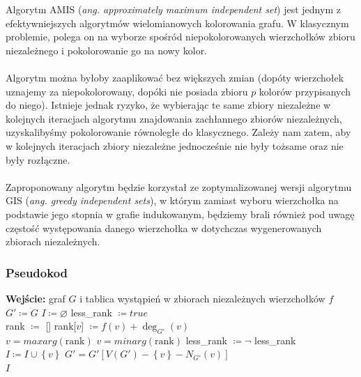 \documentclass[10pt,a4paper]{article}
\begin{document}
	Algorytm AMIS (\textit{ang. approximately maximum independent set}) jest jednym z efektywniejszych algorytmów wielomianowych kolorowania grafu. W klasycznym problemie, polega on na wyborze spośród niepokolorowanych wierzchołków zbioru niezależnego i pokolorowanie go na nowy kolor. \\~\\
	Algorytm można byłoby zaaplikować bez większych zmian (dopóty wierzchołek uznajemy za niepokolorowany, dopóki nie posiada zbioru $p$ kolorów przypisanych do niego). Istnieje jednak ryzyko, że wybierając te same zbiory niezależne w kolejnych iteracjach algorytmu znajdowania zachłannego zbiorów niezależnych, uzyskalibyśmy pokolorowanie równoległe do klasycznego. Zależy nam zatem, aby w kolejnych iteracjach zbiory niezależne jednocześnie  nie były tożsame oraz nie były rozłączne. \\~\\
	Zaproponowany algorytm będzie korzystał ze zoptymalizowanej wersji algorytmu GIS (\textit{ang. greedy independent sets}), w którym zamiast wyboru wierzchołka na podstawie jego stopnia w grafie indukowanym, będziemy brali również pod uwagę częstość występowania danego wierzchołka w dotychczas wygenerowanych zbiorach niezależnych. 
	
	\subsubsection{Pseudokod}
	
	\begin{algorithmic}
		\State \textbf{Wejście:} graf $G$ i tablica wystąpień w zbiorach niezależnych wierzchołków $f$
		\\
			\State $G' \coloneqq G$
			\State $I \coloneqq \varnothing$
			\State less\_rank $\coloneqq true$
			\\
				\State rank $\coloneqq$ [] 
				\State rank[$v$] $\coloneqq f(v) + \deg_{G'}(v)$ 
				\EndFor
				\\
					\State $v = maxarg(\text{rank})$
				\Else
					\State $v = minarg(\text{rank})$
				\EndIf
				\State less\_rank $\coloneqq \neg$ less\_rank
				\\
				\State $I \coloneqq I \cup \left\{v\right\}$
				\State $G' = G'[V(G') - \left\{v\right\}- N_{G'}(v)]$
			\EndWhile
			\\
			\State \Return $I$
		\EndFunction
	\end{algorithmic}
	
\end{document}
